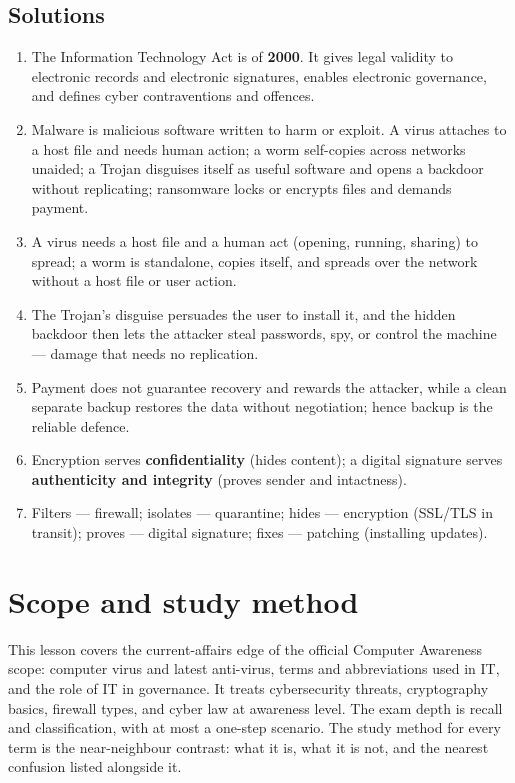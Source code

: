 \subsection*{Solutions}
\begingroup\small
\begin{enumerate}[label=\arabic*.]
  \item The Information Technology Act is of \textbf{2000}. It gives legal
    validity to electronic records and electronic signatures, enables
    electronic governance, and defines cyber contraventions and offences.
  \item Malware is malicious software written to harm or exploit. A virus
    attaches to a host file and needs human action; a worm self-copies
    across networks unaided; a Trojan disguises itself as useful software
    and opens a backdoor without replicating; ransomware locks or encrypts
    files and demands payment.
  \item A virus needs a host file and a human act (opening, running,
    sharing) to spread; a worm is standalone, copies itself, and spreads
    over the network without a host file or user action.
  \item The Trojan's disguise persuades the user to install it, and the
    hidden backdoor then lets the attacker steal passwords, spy, or
    control the machine --- damage that needs no replication.
  \item Payment does not guarantee recovery and rewards the attacker,
    while a clean separate backup restores the data without negotiation;
    hence backup is the reliable defence.
  \item Encryption serves \textbf{confidentiality} (hides content);
    a digital signature serves \textbf{authenticity and integrity}
    (proves sender and intactness).
  \item Filters --- firewall; isolates --- quarantine; hides ---
    encryption (SSL/TLS in transit); proves --- digital signature;
    fixes --- patching (installing updates).
\end{enumerate}
\endgroup

\section{Scope and study method}
This lesson covers the current-affairs edge of the official Computer Awareness
scope: computer virus and latest anti-virus, terms and abbreviations used in
IT, and the role of IT in governance. It treats cybersecurity threats,
cryptography basics, firewall types, and cyber law at awareness level. The
exam depth is recall and classification, with at most a one-step scenario.
The study method for every term is the near-neighbour contrast: what it is,
what it is not, and the nearest confusion listed alongside it.

